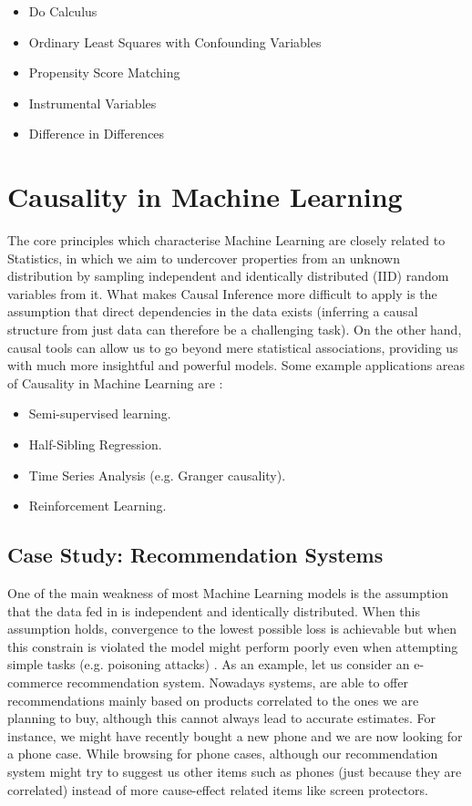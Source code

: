 \begin{itemize}
    \item Do Calculus
    \item Ordinary Least Squares with Confounding Variables
    \item Propensity Score Matching
    \item Instrumental Variables
    \item Difference in Differences
\end{itemize}

\section{Causality in Machine Learning}

The core principles which characterise Machine Learning are closely related to Statistics, in which we aim to undercover properties from an unknown distribution by sampling independent and identically distributed (IID) random variables from it. What makes Causal Inference more difficult to apply is the assumption that direct dependencies in the data exists (inferring a causal structure from just data can therefore be a challenging task). On the other hand, causal tools can allow us to go beyond mere statistical associations, providing us with much more insightful and powerful models. Some example applications areas of Causality in Machine Learning are \cite{ml_peters}:
\begin{itemize}
    \item Semi-supervised learning.
    \item Half-Sibling Regression.
    \item Time Series Analysis (e.g. Granger causality).
    \item Reinforcement Learning.
\end{itemize}

\subsection{Case Study: Recommendation Systems}

One of the main weakness of most Machine Learning models is the assumption that the data fed in is independent and identically distributed. When this assumption holds, convergence to the lowest possible loss is achievable but when this constrain is violated the model might perform poorly even when attempting simple tasks (e.g. poisoning attacks) \cite{six}.
As an example, let us consider an e-commerce recommendation system. Nowadays systems, are able to offer recommendations mainly based on products correlated to the ones we are planning to buy, although this cannot always lead to accurate estimates. For instance, we might have recently bought a new phone and we are now looking for a phone case. While browsing for phone cases, although our recommendation system might try to suggest us other items such as phones (just because they are correlated) instead of more cause-effect related items like screen protectors.